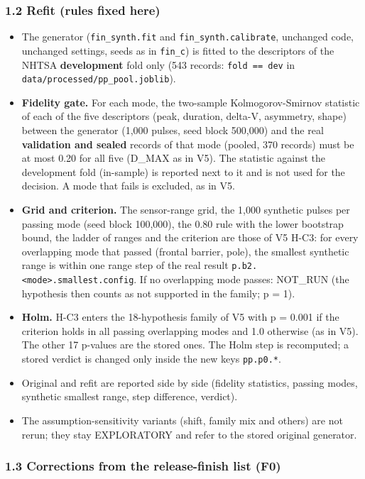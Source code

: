 \subsubsection*{1.2 Refit (rules fixed here)}

\begin{itemize}
\item The generator (\texttt{fin\_synth.fit} and \texttt{fin\_synth.calibrate}, unchanged code, unchanged settings, seeds as in \texttt{fin\_c}) is fitted to the descriptors of the NHTSA \textbf{development} fold only (543 records: \texttt{fold == dev} in \texttt{data/processed/pp\_pool.joblib}).
\item \textbf{Fidelity gate.} For each mode, the two-sample Kolmogorov-Smirnov statistic of each of the five descriptors (peak, duration, delta-V, asymmetry, shape) between the generator (1,000 pulses, seed block 500,000) and the real \textbf{validation and sealed} records of that mode (pooled, 370 records) must be at most 0.20 for all five (D\_MAX as in V5). The statistic against the development fold (in-sample) is reported next to it and is not used for the decision. A mode that fails is excluded, as in V5.
\item \textbf{Grid and criterion.} The sensor-range grid, the 1,000 synthetic pulses per passing mode (seed block 100,000), the 0.80 rule with the lower bootstrap bound, the ladder of ranges and the criterion are those of V5 H-C3: for every overlapping mode that passed (frontal barrier, pole), the smallest synthetic range is within one range step of the real result \texttt{p.b2.<mode>.smallest.config}. If no overlapping mode passes: NOT\_RUN (the hypothesis then counts as not supported in the family; p = 1).
\item \textbf{Holm.} H-C3 enters the 18-hypothesis family of V5 with p = 0.001 if the criterion holds in all passing overlapping modes and 1.0 otherwise (as in V5). The other 17 p-values are the stored ones. The Holm step is recomputed; a stored verdict is changed only inside the new keys \texttt{pp.p0.*}.
\item Original and refit are reported side by side (fidelity statistics, passing modes, synthetic smallest range, step difference, verdict).
\item The assumption-sensitivity variants (shift, family mix and others) are not rerun; they stay EXPLORATORY and refer to the stored original generator.
\end{itemize}

\subsubsection*{1.3 Corrections from the release-finish list (F0)}

